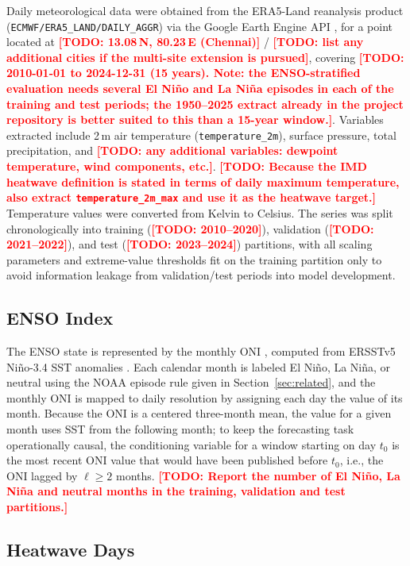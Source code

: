 \documentclass[conference]{IEEEtran}
\newcommand{\TODO}[1]{\textcolor{red}{\textbf{[TODO: #1]}}}
\begin{document}
Daily meteorological data were obtained from the ERA5-Land reanalysis product
\cite{munozsabater2021era5land,hersbach2020era5} (\texttt{ECMWF/ERA5\_LAND/DAILY\_AGGR}) via the Google
Earth Engine API \cite{gorelick2017gee}, for a point located at \TODO{13.08\,\textdegree N,
80.23\,\textdegree E (Chennai)} / \TODO{list any additional cities if the multi-site extension is
pursued}, covering \TODO{2010-01-01 to 2024-12-31 (15 years). Note: the ENSO-stratified evaluation needs
several El Ni\~{n}o and La Ni\~{n}a episodes in each of the training and test periods; the 1950--2025
extract already in the project repository is better suited to this than a 15-year window.}. Variables
extracted include 2\,m air temperature (\texttt{temperature\_2m}), surface pressure, total
precipitation, and \TODO{any additional variables: dewpoint temperature, wind components, etc.}.
\TODO{Because the IMD heatwave definition is stated in terms of daily maximum temperature, also extract
\texttt{temperature\_2m\_max} and use it as the heatwave target.} Temperature values were converted from
Kelvin to Celsius. The series was split chronologically into training (\TODO{2010--2020}), validation
(\TODO{2021--2022}), and test (\TODO{2023--2024}) partitions, with all scaling parameters and
extreme-value thresholds fit on the training partition only to avoid information leakage from
validation/test periods into model development.

\subsection{ENSO Index}

The ENSO state is represented by the monthly ONI \cite{noaa_oni}, computed from ERSSTv5 Ni\~{n}o-3.4
SST anomalies \cite{huang2017ersstv5}. Each calendar month is labeled El Ni\~{n}o, La Ni\~{n}a, or
neutral using the NOAA episode rule given in Section~\ref{sec:related}, and the monthly ONI is mapped
to daily resolution by assigning each day the value of its month. Because the ONI is a centered
three-month mean, the value for a given month uses SST from the following month; to keep the
forecasting task operationally causal, the conditioning variable for a window starting on day $t_0$ is
the most recent ONI value that would have been published before $t_0$, i.e., the ONI lagged by
$\ell \geq 2$ months. \TODO{Report the number of El Ni\~{n}o, La Ni\~{n}a and neutral months in the
training, validation and test partitions.}

\subsection{Heatwave Days}
\end{document}
